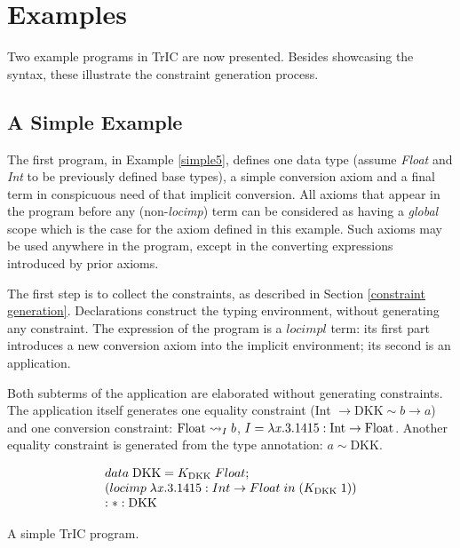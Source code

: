 \section{Examples}
\label{eg5}
Two example programs in TrIC are now presented. Besides showcasing the syntax, these illustrate the constraint generation process.
\subsection{A Simple Example}


The first program, in Example \ref{simple5}, defines one data type (assume \textit{Float} and \textit{Int} to be previously defined base types), a simple conversion axiom and a final term in conspicuous need of that implicit conversion. All axioms that appear in the program before any (non-\textit{locimp}) term can be considered as having a \textit{global} scope which is the case for the axiom defined in this example. Such axioms may be used anywhere in the program, except in the converting expressions introduced by prior axioms.

The first step is to collect the constraints, as described in Section \ref{constraint generation}. Declarations construct the typing environment, without generating any constraint. The expression of the program is a $locimpl$ term: its first part introduces a new conversion axiom into the implicit environment; its second is an application.

Both subterms of the application are elaborated without generating constraints. The application itself generates one equality constraint (Int $\to \text{DKK} \sim b \to a$) and one conversion constraint: ${\text{Float}} \rightsquigarrow_{I} {b}$, $I = \lambda \mathit{x}.3.1415 : \text{Int} \to \text{Float}$. Another equality constraint is generated from the type annotation: $a \sim \text{DKK}$.

\begin{eg}
     \[
\begin{array}{@{\hspace{0mm}}l@{\hspace{0mm}}}
  data\;\text{DKK}=K_{\text{DKK}}\;Float;\\
  (\monolocal{Int}{Float}{\lambda \tmVar.3.1415} (K_{\text{DKK}}\;1))\\
  :*: \text{DKK}
\end{array}
\]
\label{simple5}
\caption{A simple TrIC program.}
\end{eg}
